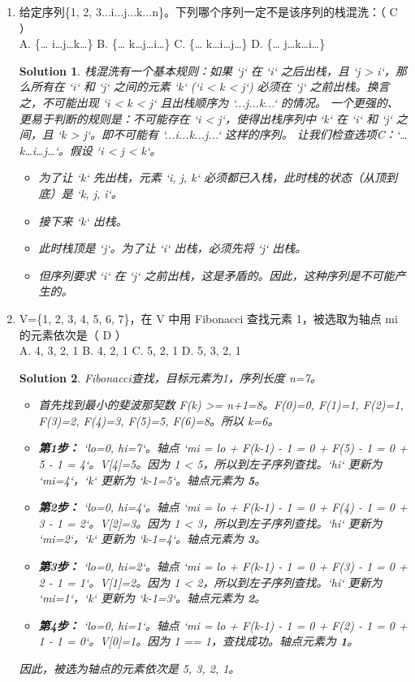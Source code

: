 \documentclass[UTF8]{report}
\newtheorem{solution}{Solution}
\theoremstyle{MyLineTheoremStyle} %
\theoremstyle{MyBlockTheoremStyle} %
\theoremstyle{MySubsubsectionStyle} %
\begin{document}
\begin{enumerate}
    \item 给定序列\{1, 2, 3...i...j...k...n\}。下列哪个序列一定不是该序列的栈混洗：（ C ）\\
    A. \{… i…j…k…\} \quad B. \{… k…j…i…\} \quad C. \{… k…i…j…\} \quad D. \{… j…k…i…\}
    \begin{solution}
        栈混洗有一个基本规则：如果 `j` 在 `i` 之后出栈，且 `j > i`，那么所有在 `i` 和 `j` 之间的元素 `k` (`i < k < j`) 必须在 `j` 之前出栈。换言之，不可能出现 `i < k < j` 且出栈顺序为 `...j...k...` 的情况。
        一个更强的、更易于判断的规则是：不可能存在 `i < j`，使得出栈序列中 `k` 在 `i` 和 `j` 之间，且 `k > j`。即不可能有 `...i...k...j...` 这样的序列。
        让我们检查选项C：`{… k…i…j…}`。假设 `i < j < k`。
        \begin{itemize}
            \item 为了让 `k` 先出栈，元素 `i, j, k` 必须都已入栈，此时栈的状态（从顶到底）是 `k, j, i`。
            \item 接下来 `k` 出栈。
            \item 此时栈顶是 `j`。为了让 `i` 出栈，必须先将 `j` 出栈。
            \item 但序列要求 `i` 在 `j` 之前出栈，这是矛盾的。因此，这种序列是不可能产生的。
        \end{itemize}
    \end{solution}

    \item V=\{1, 2, 3, 4, 5, 6, 7\}，在 V 中用 Fibonacci 查找元素 1，被选取为轴点 mi 的元素依次是（ D ）\\
    A. 4, 3, 2, 1 \quad B. 4, 2, 1 \quad C. 5, 2, 1 \quad D. 5, 3, 2, 1
    \begin{solution}
        Fibonacci查找，目标元素为1，序列长度 n=7。
        \begin{itemize}
            \item 首先找到最小的斐波那契数 F(k) >= n+1=8。F(0)=0, F(1)=1, F(2)=1, F(3)=2, F(4)=3, F(5)=5, F(6)=8。所以 k=6。
            \item \textbf{第1步：} `lo=0, hi=7`。轴点 `mi = lo + F(k-1) - 1 = 0 + F(5) - 1 = 0 + 5 - 1 = 4`。V[4]=5。因为 1 < 5，所以到左子序列查找。`hi` 更新为 `mi=4`，`k` 更新为 `k-1=5`。轴点元素为 \textbf{5}。
            \item \textbf{第2步：} `lo=0, hi=4`。轴点 `mi = lo + F(k-1) - 1 = 0 + F(4) - 1 = 0 + 3 - 1 = 2`。V[2]=3。因为 1 < 3，所以到左子序列查找。`hi` 更新为 `mi=2`，`k` 更新为 `k-1=4`。轴点元素为 \textbf{3}。
            \item \textbf{第3步：} `lo=0, hi=2`。轴点 `mi = lo + F(k-1) - 1 = 0 + F(3) - 1 = 0 + 2 - 1 = 1`。V[1]=2。因为 1 < 2，所以到左子序列查找。`hi` 更新为 `mi=1`，`k` 更新为 `k-1=3`。轴点元素为 \textbf{2}。
            \item \textbf{第4步：} `lo=0, hi=1`。轴点 `mi = lo + F(k-1) - 1 = 0 + F(2) - 1 = 0 + 1 - 1 = 0`。V[0]=1。因为 1 == 1，查找成功。轴点元素为 \textbf{1}。
        \end{itemize}
        因此，被选为轴点的元素依次是 5, 3, 2, 1。
    \end{solution}


\end{enumerate}
\end{document}
